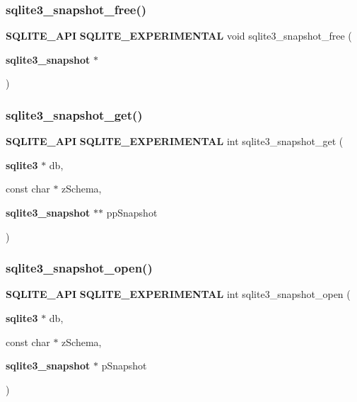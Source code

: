 \mbox{\label{sqlite3_8h_ac1a7ec690c15c45d4df900864c677fcf}} 
\subsubsection{sqlite3\_snapshot\_free()}
{\footnotesize\ttfamily \textbf{ S\+Q\+L\+I\+T\+E\+\_\+\+A\+PI} \textbf{ S\+Q\+L\+I\+T\+E\+\_\+\+E\+X\+P\+E\+R\+I\+M\+E\+N\+T\+AL} void sqlite3\+\_\+snapshot\+\_\+free (\begin{DoxyParamCaption}\item[{\textbf{ sqlite3\+\_\+snapshot} $\ast$}]{ }\end{DoxyParamCaption})}

\mbox{\label{sqlite3_8h_ac4ed3610be25685494fda139fe711527}} 
\subsubsection{sqlite3\_snapshot\_get()}
{\footnotesize\ttfamily \textbf{ S\+Q\+L\+I\+T\+E\+\_\+\+A\+PI} \textbf{ S\+Q\+L\+I\+T\+E\+\_\+\+E\+X\+P\+E\+R\+I\+M\+E\+N\+T\+AL} int sqlite3\+\_\+snapshot\+\_\+get (\begin{DoxyParamCaption}\item[{\textbf{ sqlite3} $\ast$}]{db,  }\item[{const char $\ast$}]{z\+Schema,  }\item[{\textbf{ sqlite3\+\_\+snapshot} $\ast$$\ast$}]{pp\+Snapshot }\end{DoxyParamCaption})}

\mbox{\label{sqlite3_8h_a4e682eda54693df7f52c85f5e798323f}} 
\subsubsection{sqlite3\_snapshot\_open()}
{\footnotesize\ttfamily \textbf{ S\+Q\+L\+I\+T\+E\+\_\+\+A\+PI} \textbf{ S\+Q\+L\+I\+T\+E\+\_\+\+E\+X\+P\+E\+R\+I\+M\+E\+N\+T\+AL} int sqlite3\+\_\+snapshot\+\_\+open (\begin{DoxyParamCaption}\item[{\textbf{ sqlite3} $\ast$}]{db,  }\item[{const char $\ast$}]{z\+Schema,  }\item[{\textbf{ sqlite3\+\_\+snapshot} $\ast$}]{p\+Snapshot }\end{DoxyParamCaption})}

